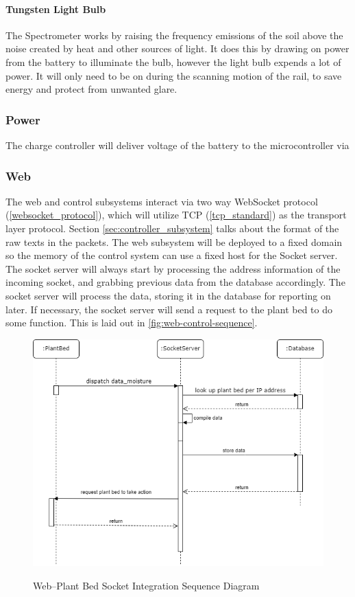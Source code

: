 \paragraph{Tungsten Light Bulb} The Spectrometer works by raising the frequency emissions of the soil above the noise created by heat and other sources of light. It does this by drawing on power from the battery to illuminate the bulb, however the light bulb expends a lot of power. It will only need to be on during the scanning motion of the rail, to save energy and protect from unwanted glare.

\subsubsection{Power} The charge controller will deliver voltage of the battery to the microcontroller via

\subsubsection{Web}
The web and control subsystems interact via two way WebSocket protocol (\ref{websocket_protocol}), which will utilize TCP (\ref{tcp_standard}) as the transport layer protocol. Section \ref{sec:controller_subsystem} talks about the format of the raw texts in the packets. The web subsystem will be deployed to a fixed domain so the memory of the control system can use a fixed host for the Socket server. The socket server will always start by processing the address information of the incoming socket, and grabbing previous data from the database accordingly. The socket server will process the data, storing it in the database for reporting on later. If necessary, the socket server will send a request to the plant bed to do some function. This is laid out in \autoref{fig:web-control-sequence}.

\begin{figure}[H]
    \caption{Web--Plant Bed Socket Integration Sequence Diagram}
    \centering
    \includegraphics[width=.75\textwidth]{images/web-control-integration-sequence.png}
    \label{fig:web-control-sequence}
\end{figure}


